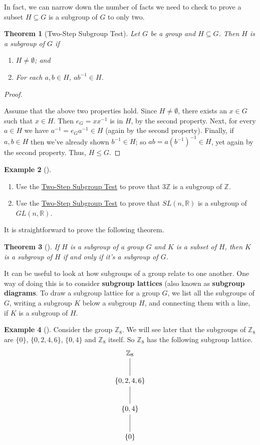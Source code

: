 \documentclass[10pt,]{book}
\newcommand{\terminology}[1]{\textbf{#1}}
\theoremstyle{plain}
\newtheorem{theorem}{Theorem}[section]
\theoremstyle{definition}
\theoremstyle{definition}
\theoremstyle{definition}
\newtheorem{example}[theorem]{Example}
\theoremstyle{definition}
\numberwithin{equation}{section}
\def\Z{\mathbb{Z}}
\def\R{\mathbb{R}}
\begin{document}
In fact, we can narrow down the number of facts we need to check to prove a subset \(H\subseteq G\) is a subgroup of \(G\) to only two.%
\begin{theorem}[{Two-Step Subgroup Test}]\label{twostep}
Let \(G\) be a group and \(H\subseteq G\). Then \(H\) is a subgroup of \(G\) if%
\leavevmode%
\begin{enumerate}
\item\hypertarget{li-208}{}\(H\neq \emptyset\); and%
\item\hypertarget{li-209}{}For each \(a,b\in H\), \(ab^{-1}\in H\).%
\end{enumerate}
\end{theorem}
\begin{proof}\hypertarget{proof-19}{}
Assume that the above two properties hold. Since \(H\neq
\emptyset\), there exists an \(x\in G\) such that \(x\in H\). Then \(e_G=xx^{-1}\) is in \(H\), by the second property. Next, for every \(a\in H\) we have \(a^{-1}=e_Ga^{-1}\in H\) (again by the second property). Finally, if \(a,b\in H\) then we've already shown \(b^{-1}\in H\); so \(ab=a(b^{-1})^{-1}\in H\), yet again by the second property. Thus, \(H\leq G\).%
\end{proof}
\begin{example}[]\label{example-37}
\leavevmode%
\begin{enumerate}
\item\hypertarget{li-210}{}Use the \hyperref[twostep]{Two-Step Subgroup Test} to prove that \(3\Z\) is a subgroup of \(\Z\).%
\item\hypertarget{li-211}{}Use the \hyperref[twostep]{Two-Step Subgroup Test} to prove that \(SL(n,\R)\) is a subgroup of \(GL(n,\R)\).%
\end{enumerate}
\end{example}
It is straightforward to prove the following theorem.%
\begin{theorem}[{}]\label{theorem-19}
If \(H\) is a subgroup of a group \(G\) and \(K\) is a subset of \(H\), then \(K\) is a subgroup of \(H\) if and only if it's a subgroup of \(G\).%
\end{theorem}
It can be useful to look at how subgroups of a group relate to one another. One way of doing this is to consider \terminology{subgroup lattices} (also known as \terminology{subgroup diagrams}. To draw a subgroup lattice for a group \(G\), we list all the subgroups of \(G\), writing a subgroup \(K\) below a subgroup \(H\), and connecting them with a line, if \(K\) is a subgroup of \(H\).%
\begin{example}[]\label{example-38}
Consider the group \(\Z_8\). We will see later that the subgroups of \(\Z_8\) are \(\{0\}\), \(\{0,2,4,6\}\), \(\{0,4\}\) and \(\Z_8\) itself. So \(\Z_8\) has the following subgroup lattice.%
{
\[\xymatrix{&\Z_8 \ar@{-}[d]&\\ &\{0,2,4,6\}\ar@{-}[d]&\\ &\{0,4\} \ar@{-}[d]&\\ &\{0\} &}\]
}
\end{example}
\end{document}
